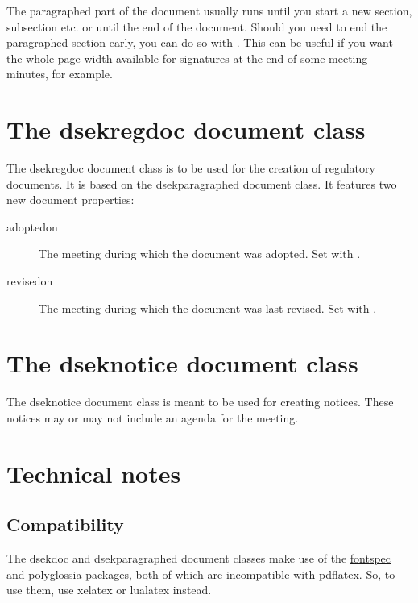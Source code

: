 \documentclass[a4paper, oneside]{ltxdoc}
\begin{document}
The paragraphed part of the document usually runs until you start a new section,
subsection etc. or until the end of the document.  Should you need to end the
paragraphed section early, you can do so with .  This can be
useful if you want the whole page width available for signatures at the end of
some meeting minutes, for example.

\section{The \textsf{dsekregdoc} document class}
The \textsf{dsekregdoc} document class is to be used for the creation of
regulatory documents.  It is based on the \textsf{dsekparagraphed} document
class.  It features two new document properties:

\begin{description}
\item[adoptedon] The meeting during which the document was adopted.  Set with
  .
\item[revisedon] The meeting during which the document was last revised.  Set
  with .
\end{description}



\section{The \textsf{dseknotice} document class}
The \textsf{dseknotice} document class is meant to be used for creating notices.
These notices may or may not include an agenda for the meeting.

\section{Technical notes}

\subsection{Compatibility}

The \textsf{dsekdoc} and \textsf{dsekparagraphed} document classes make use of
the \href{https://ctan.org/pkg/fontspec}{\textsf{fontspec}} and
\href{https://ctan.org/pkg/polyglossia}{\textsf{polyglossia}} packages, both of
which are incompatible with \textsf{pdflatex}.  So, to use them, use
\textsf{xelatex} or \textsf{lualatex} instead.
\end{document}
